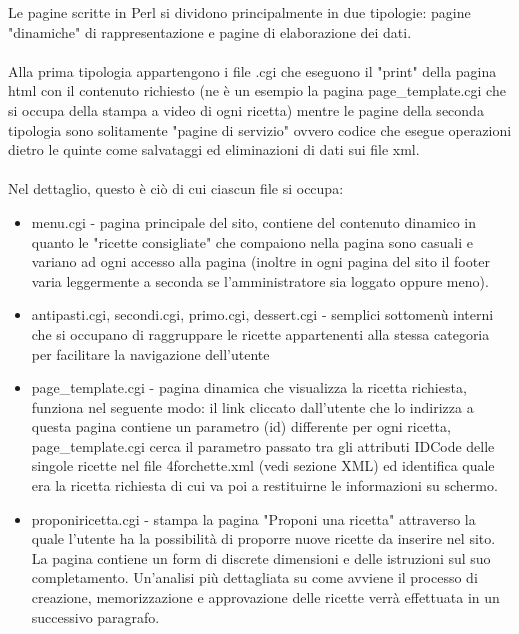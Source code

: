 \documentclass[12pt]{article}
\begin{document}
				  Le pagine scritte in Perl si dividono principalmente in due tipologie: pagine "dinamiche" di rappresentazione e pagine di elaborazione dei dati.\\ \\
				Alla prima tipologia appartengono i file .cgi che eseguono il "print" della pagina html con il contenuto richiesto (ne \`e un esempio la pagina page\_template.cgi che si occupa della stampa a video di ogni ricetta) mentre le pagine della seconda tipologia sono solitamente "pagine di servizio" ovvero codice che esegue operazioni dietro le quinte come salvataggi ed eliminazioni di dati sui file xml. \\ \\Nel dettaglio, questo \`e ci\`o di cui ciascun file si occupa:
\begin{itemize}

				\item  menu.cgi - pagina principale del sito, contiene del contenuto dinamico in quanto le "ricette consigliate" che compaiono nella pagina sono casuali e variano ad ogni accesso alla pagina (inoltre in ogni pagina del sito il footer varia leggermente a seconda se l'amministratore sia loggato oppure meno).
				
				\item  antipasti.cgi, secondi.cgi, primo.cgi, dessert.cgi - semplici sottomen\`u interni che si occupano di raggruppare le ricette appartenenti alla stessa categoria per facilitare la navigazione dell'utente

				\item page\_template.cgi - pagina dinamica che visualizza la ricetta richiesta, funziona nel seguente modo: il link cliccato dall'utente che lo indirizza a questa pagina contiene un parametro (id) differente per ogni ricetta, page\_template.cgi cerca il parametro passato tra gli attributi IDCode delle singole ricette nel file 4forchette.xml (vedi sezione XML) ed identifica quale era la ricetta richiesta di cui va poi a restituirne le informazioni su schermo.

				\item proponiricetta.cgi - stampa la pagina "Proponi una ricetta" attraverso la quale l'utente ha la possibilit\`a di proporre nuove ricette da inserire nel sito. La pagina contiene un form di discrete dimensioni e delle istruzioni sul suo completamento. Un'analisi pi\`u dettagliata su come avviene il processo di creazione, memorizzazione e approvazione delle ricette verr\`a effettuata in un successivo paragrafo.


\end{itemize}
\end{document}
